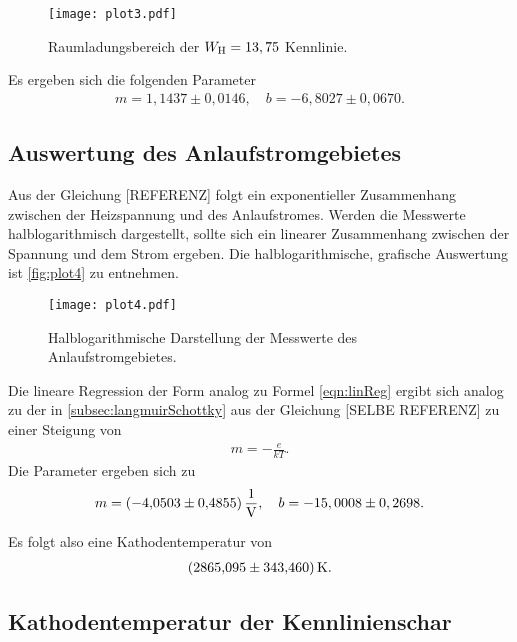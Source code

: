 \begin{figure}[H]
  \centering
  \texttt{[image: plot3.pdf]}
  \caption{Raumladungsbereich der $W_{\text H} = 13,75$ Kennlinie.}
  \label{fig:plot3}
\end{figure}

\noindent
Es ergeben sich die folgenden Parameter
\begin{align*}
  m = 1,1437 \pm 0,0146, \quad
  b = -6,8027 \pm 0,0670.
\end{align*}

\subsection{Auswertung des Anlaufstromgebietes}
\label{subsec:anlaufstrom}

Aus der Gleichung [REFERENZ] folgt ein exponentieller Zusammenhang zwischen der Heizspannung und des Anlaufstromes.
Werden die Messwerte halblogarithmisch dargestellt, sollte sich ein linearer Zusammenhang zwischen der Spannung und dem Strom ergeben.
Die halblogarithmische, grafische Auswertung ist \autoref{fig:plot4} zu entnehmen.

\begin{figure}[H]
  \centering
  \texttt{[image: plot4.pdf]}
  \caption{Halblogarithmische Darstellung der Messwerte des Anlaufstromgebietes.}
  \label{fig:plot4}
\end{figure}

\noindent
Die lineare Regression der Form analog zu Formel \eqref{eqn:linReg} ergibt sich analog zu der in \autoref{subsec:langmuirSchottky} aus der Gleichung [SELBE REFERENZ] zu einer Steigung von
\begin{align}
  \label{eqn:steigung}
  m = -\frac{e}{kT}.
\end{align}
Die Parameter ergeben sich zu
\begin{align*}
  m =  \SI{-4,0503 \pm 0,4855}{\per\volt}, \quad
  b = -15,0008 \pm 0,2698.
\end{align*}

Es folgt also eine Kathodentemperatur von
\begin{align*}
  \SI{2865.095 \pm 343.460}{\kelvin}.
\end{align*}

\subsection{Kathodentemperatur der Kennlinienschar}
\label{subsec:kathodenTempSchar}

